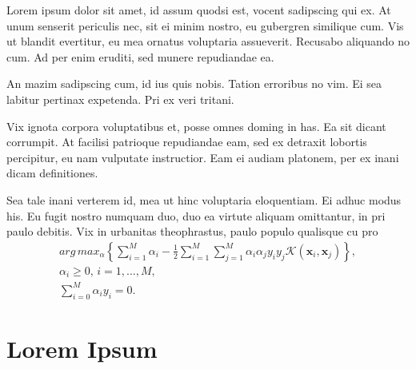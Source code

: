 Lorem ipsum dolor sit amet, id assum quodsi est, vocent sadipscing qui ex. At unum senserit periculis nec, sit ei minim nostro, eu gubergren similique cum. Vis ut blandit evertitur, eu mea ornatus voluptaria assueverit. Recusabo aliquando no cum. Ad per enim eruditi, sed munere repudiandae ea.

An mazim sadipscing cum, id ius quis nobis. Tation erroribus no vim. Ei sea labitur pertinax expetenda. Pri ex veri tritani.

Vix ignota corpora voluptatibus et, posse omnes doming in has. Ea sit dicant corrumpit. At facilisi patrioque repudiandae eam, sed ex detraxit lobortis percipitur, eu nam vulputate instructior. Eam ei audiam platonem, per ex inani dicam definitiones.

Sea tale inani verterem id, mea ut hinc voluptaria eloquentiam. Ei adhuc modus his. Eu fugit nostro numquam duo, duo ea virtute aliquam omittantur, in pri paulo debitis. Vix in urbanitas theophrastus, paulo populo qualisque cu pro~\cite{Ahangi2012,Akram2014,Akram2015}
\begin{eqnarray}
  arg\, max_\alpha\left\{ \sum_{i=1}^M \alpha_i - \frac{1}{2} \sum_{i=1}^M\sum_{j=1}^M \alpha_i\alpha_j y_i y_j \mathcal{K}(\textbf{x}_i,\textbf{x}_j)\right\},\label{ec:svmdual}\\
  \alpha_i \geq 0,\, i=1,...,M, \nonumber\\
  \sum_{i=0}^M \alpha_i y_i=0. \nonumber
\end{eqnarray}

\section{Lorem Ipsum}
  